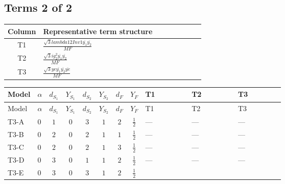 \documentclass[8pt]{article}
\begin{document}
\begin{landscape}
\subsection*{Terms 2 of 2}
\begin{center}
\begin{tabular}{@{}c >{\raggedright\arraybackslash}p{0.82\linewidth}@{}}
\toprule
Column & Representative term structure \\
\midrule
T1 & \(\displaystyle \frac{\sqrt{3} lambda12Inv1 \overline{y_{1}} \overline{y_{2}}}{MF}\) \\
\midrule
T2 & \(\displaystyle \frac{\sqrt{3} i g_{2}^{2} \overline{y_{1}} \overline{y_{2}}}{MF}\) \\
\midrule
T3 & \(\displaystyle \frac{\sqrt{3} ye \overline{y_{1}} \overline{y_{2}} \overline{ye}}{MF}\) \\
\midrule
\bottomrule
\end{tabular}
\end{center}
\smallskip
\tiny
\begin{longtable}{@{}llcccccc >{\raggedright\arraybackslash}p{0.21\linewidth} >{\raggedright\arraybackslash}p{0.21\linewidth} >{\raggedright\arraybackslash}p{0.21\linewidth}@{}}
\toprule
Model & $\alpha$ & $d_{S_1}$ & $Y_{S_1}$ & $d_{S_2}$ & $Y_{S_2}$ & $d_F$ & $Y_F$ & T1 & T2 & T3 \\
\midrule
\endfirsthead
\toprule
Model & $\alpha$ & $d_{S_1}$ & $Y_{S_1}$ & $d_{S_2}$ & $Y_{S_2}$ & $d_F$ & $Y_F$ & T1 & T2 & T3 \\
\midrule
\endhead
T3-A & $0$ & $1$ & $0$ & $3$ & $1$ & $2$ & $\frac{1}{2}$ & --- & --- & --- \\
\midrule
T3-B & $0$ & $2$ & $0$ & $2$ & $1$ & $1$ & $\frac{1}{2}$ & --- & --- & --- \\
\midrule
T3-C & $0$ & $2$ & $0$ & $2$ & $1$ & $3$ & $\frac{1}{2}$ & --- & --- & --- \\
\midrule
T3-D & $0$ & $3$ & $0$ & $1$ & $1$ & $2$ & $\frac{1}{2}$ & --- & --- & --- \\
\midrule
T3-E & $0$ & $3$ & $0$ & $3$ & $1$ & $2$ & $\frac{1}{2}$ & \scriptsize\adjustbox{max width=\linewidth}{$\begin{gathered} \frac{\sqrt{3} lambda12Inv1 \overline{y_{1}} \overline{y_{2}}}{6 MF}\end{gathered}$} & \scriptsize\adjustbox{max width=\linewidth}{$\begin{gathered} - \frac{\sqrt{3} i g_{2}^{2} \overline{y_{1}} \overline{y_{2}}}{6 MF}\end{gathered}$} & \scriptsize\adjustbox{max width=\linewidth}{$\begin{gathered} \frac{\sqrt{3} ye \overline{y_{1}} \overline{y_{2}} \overline{ye}}{12 MF}\end{gathered}$} \\
\midrule
\bottomrule
\end{longtable}
\clearpage

\end{landscape}
\end{document}
